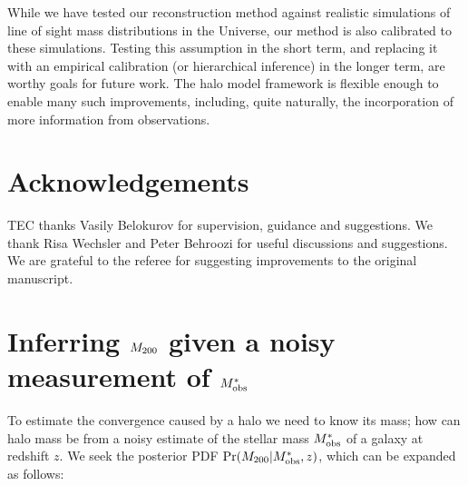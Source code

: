 \documentclass[useAMS,usenatbib,a4paper]{mn2e}
\begin{document}
While we have tested our reconstruction method against realistic simulations
of line of sight mass distributions in the Universe, our method is also 
calibrated to these simulations. Testing this assumption in the short term,
and replacing it with an empirical calibration (or hierarchical inference) in
the longer term, are worthy goals for future work. The halo model framework is
flexible enough to enable many such improvements, including, quite naturally,
the incorporation of more information from observations. 



\section*{Acknowledgements}
 
TEC thanks Vasily Belokurov for supervision, guidance and suggestions.
We thank Risa Wechsler and Peter Behroozi 
for useful discussions and suggestions. We are grateful to the referee
for suggesting improvements to the original manuscript.



\appendix


\section{Inferring $M_{200}$ given a noisy measurement of $M^{*}_{\rm obs}$}
\label{appendix:MSMH}

To estimate the convergence caused by a halo we need to know its mass; how can 
halo mass be \infered from a noisy estimate of the stellar mass $M^{*}_{\rm obs}$
of a galaxy at redshift $z$. We seek the posterior
PDF $\Pr(M_{200}|M^{*}_{\rm obs},z)$, which can be expanded as follows:
\end{document}
